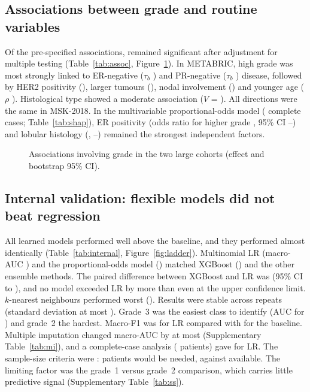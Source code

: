 \subsection{Associations between grade and routine variables}
Of the \NTests{} pre-specified associations, \NSigTests{} remained significant after adjustment for
multiple testing (Table~\ref{tab:assoc}, Figure~\ref{fig:assoc}). In METABRIC, high grade was most
strongly linked to ER-negative ($\tau_b$ \TauER) and PR-negative ($\tau_b$ \TauPR) disease, followed
by HER2 positivity (\TauHER), larger tumours (\TauT), nodal involvement (\TauN) and younger age
($\rho$ \RhoAge). Histological type showed a moderate association ($V$ = \VHist). All directions were
the same in MSK-2018. In the multivariable proportional-odds model (\NOrdinal{} complete cases;
Table~\ref{tab:shap}), ER positivity (odds ratio for higher grade \OrER, 95\% CI \OrERlo--\OrERhi) and
lobular histology (\OrILC, \OrILClo--\OrILChi) remained the strongest independent factors.

\begin{table}[htbp]\centering\small
\caption{Scale-appropriate associations with bootstrap 95\% CIs and Benjamini--Hochberg-adjusted
$p$ values. Binary variables are coded 1 = present/positive, so a negative $\tau_b$ for ER means
ER-positive tumours tend to be lower grade.}\label{tab:assoc}
\tabfit{}
\end{table}

\begin{figure}[htbp]\centering
{}
\caption{Associations involving grade in the two large cohorts (effect and bootstrap 95\% CI).}\label{fig:assoc}
\end{figure}

\subsection{Internal validation: flexible models did not beat regression}
All learned models performed well above the baseline, and they performed almost identically
(Table~\ref{tab:internal}, Figure~\ref{fig:ladder}). Multinomial LR (macro-AUC \MlrIntAuc) and the
proportional-odds model (\OrdIntAuc) matched XGBoost (\XgbIntAuc) and the other ensemble methods.
The paired difference between XGBoost and LR was \XgbDeltaInt{} (95\% CI \XgbDeltaIntLo{} to
\XgbDeltaIntHi), and no model exceeded LR by more than \MaxDeltaIntHi{} even at the upper confidence
limit. $k$-nearest neighbours performed worst (\KnnIntAuc). Results were stable across repeats
(standard deviation at most \MaxRepSd). Grade~3 was the easiest class to identify (AUC
\BestIntGThreeAuc{} for \BestIntModel) and grade~2 the hardest. Macro-F1 was \MlrIntFOne{} for LR
compared with \MajIntFOne{} for the baseline. Multiple imputation changed macro-AUC by at most
\MIDiffMax{} (Supplementary Table~\ref{tab:mi}), and a complete-case analysis (\NComplete{} patients)
gave \CCMlrAuc{} for LR. The sample-size criteria were \SSMet: \SSRequired{} patients would be needed,
against \SSAvailable{} available. The limiting factor was the grade~1 versus grade~2 comparison,
which carries little predictive signal (Supplementary Table~\ref{tab:ss}).

